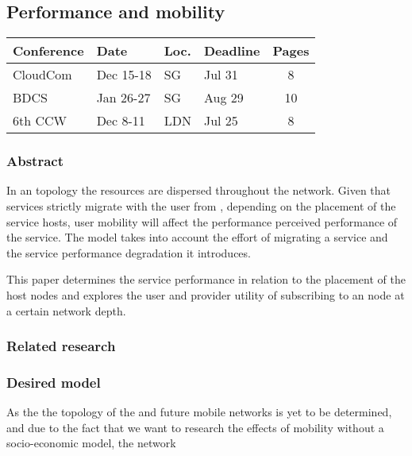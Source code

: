 \subsection{Performance and mobility}
\begin{table}[H]
\small
\begin{tabular}{|l|l|l|l|c|} \hline
\textbf{Conference} & \textbf{Date} & \textbf{Loc.} & \textbf{Deadline} & \textbf{Pages} \\ \hline
CloudCom & Dec 15-18 & SG & Jul 31 & 8 \\ \hline
BDCS & Jan 26-27 & SG & Aug 29 & 10	\\ \hline
6th CCW & Dec 8-11 & LDN & Jul 25 & 8 \\ \hline
\end{tabular}
\end{table}

\subsubsection{Abstract}
In an \xcloud topology the resources are dispersed throughout the network. Given that services strictly migrate with the user from , depending on the placement of the service hosts, user mobility will affect the performance perceived performance of the service. The model takes into account the effort of migrating a service and the service performance degradation it introduces.

This paper determines the service performance in relation to the placement of the \xcloud host nodes and explores the user and provider utility of subscribing to an \xcloud node at a certain network depth.

\subsubsection{Related research}


\subsubsection{Desired model}
As the the topology of the \xcloud and future mobile networks is yet to be determined, and due to the fact that we want to research the effects of mobility without a socio-economic model, the network 

